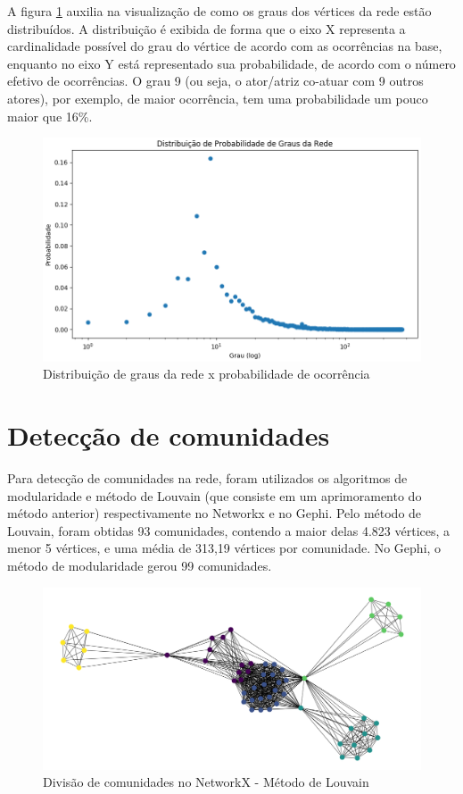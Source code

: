 A figura \ref{fig:grau-netflix} auxilia na visualização de como os graus dos vértices da rede estão distribuídos. A distribuição é exibida de forma que o eixo X representa a cardinalidade possível do grau do vértice de acordo com as ocorrências na base, enquanto no eixo Y está representado sua probabilidade, de acordo com o número efetivo de ocorrências. O grau 9 (ou seja, o ator/atriz co-atuar com 9 outros atores), por exemplo, de maior ocorrência, tem uma probabilidade um pouco maior que 16\%.

\begin{figure}[!htb]
\centering
\includegraphics[width=13cm]{img/grau-probabilidade-netflix.png}
\caption{Distribuição de graus da rede x probabilidade de ocorrência}
\label{fig:grau-netflix}
\end{figure}


\section{Detecção de comunidades}

Para detecção de comunidades na rede, foram utilizados os algoritmos de modularidade e método de Louvain (que consiste em um aprimoramento do método anterior) respectivamente no Networkx e no Gephi. Pelo método de Louvain, foram obtidas 93 comunidades, contendo a maior delas 4.823 vértices, a menor 5 vértices, e uma média de 313,19 vértices por comunidade. No Gephi, o método de modularidade gerou 99 comunidades.

\begin{figure}[!htb]
\centering
\includegraphics[width=14cm]{img/Figure_3.png}
\caption{Divisão de comunidades no NetworkX - Método de Louvain}
\label{fig:sub-comunidades}
\end{figure}

